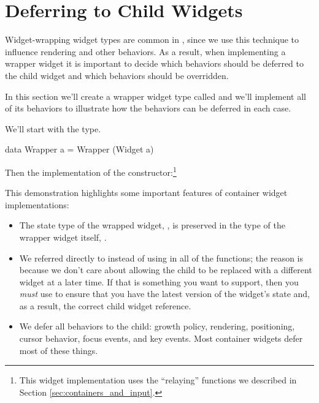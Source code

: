 \section{Deferring to Child Widgets}
\label{sec:deferring}

Widget-wrapping widget types are common in \vtyui, since we use this
technique to influence rendering and other behaviors.  As a result,
when implementing a wrapper widget it is important to decide which
behaviors should be deferred to the child widget and which behaviors
should be overridden.

In this section we'll create a wrapper widget type called 
and we'll implement all of its behaviors to illustrate how the
behaviors can be deferred in each case.

We'll start with the type.

\begin{haskellcode}
 data Wrapper a = Wrapper (Widget a)
\end{haskellcode}

Then the implementation of the constructor:\footnote{This widget
  implementation uses the ``relaying'' functions we described in
  Section \ref{sec:containers_and_input}.}


This demonstration highlights some important features of container
widget implementations:

\begin{itemize}
\item The state type of the wrapped widget, , is preserved in
  the type of the wrapper widget itself, .
\item We referred directly to  instead of using
   in all of the functions; the reason is because we
  don't care about allowing the child to be replaced with a different
  widget at a later time.  If that is something you want to support,
  then you \textit{must} use  to ensure that you have the
  latest version of the widget's state and, as a result, the correct
  child widget reference.
\item We defer all behaviors to the child: growth policy, rendering,
  positioning, cursor behavior, focus events, and key events.  Most
  container widgets defer most of these things.
\end{itemize}

